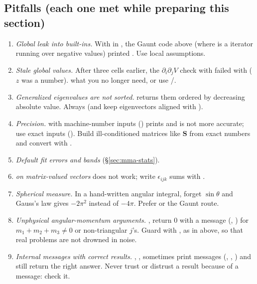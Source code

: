 \documentclass[11pt,a4paper]{article}
\numberwithin{equation}{section}
\theoremstyle{definition}
\theoremstyle{plain}
\theoremstyle{remark}
\numberwithin{algorithm}{section}
\newcommand{\mS}{\mathbf S}
\begin{document}
\subsection{Pitfalls (each one met while preparing this section)}\label{sec:mma-pitfalls}
\begin{enumerate}[leftmargin=1.5em,itemsep=3pt]
\item \emph{Global  leak into built-ins.} With  in , the Gaunt code above (where  is a  iterator running over negative values) printed . Use local assumptions.
\item \emph{Stale global values.} After  three cells earlier, the $\partial_i\partial_jV$ check with  failed with  ($z$ was a number).  what you no longer need, or use /.
\item \emph{Generalized eigenvalues are not sorted.}  returns them ordered by decreasing absolute value. Always  (and keep eigenvectors aligned with ).
\item \emph{Precision.}  with machine-number inputs () prints  and is not more accurate; use exact inputs (). Build ill-conditioned matrices like $\mS$ from exact numbers and convert with .
\item \emph{Default fit errors and bands} (\S\ref{sec:mma-stats}).
\item \emph{ on matrix-valued vectors} does not work; write $\epsilon_{ijk}$ sums with .
\item \emph{Spherical measure.} In a hand-written angular integral, forget $\sin\theta$ and Gauss's law gives $-2\pi^2$ instead of $-4\pi$. Prefer  or the Gaunt route.
\item \emph{Unphysical angular-momentum arguments.} ,  return $0$ with a message (, ) for $m_1+m_2+m_3\ne0$ or non-triangular $j$'s. Guard with , as in  above, so that real problems are not drowned in noise.
\item \emph{Internal messages with correct results.} , ,  sometimes print messages (, , ) and still return the right answer. Never trust or distrust a result because of a message: check it.

\end{enumerate}
\end{document}
